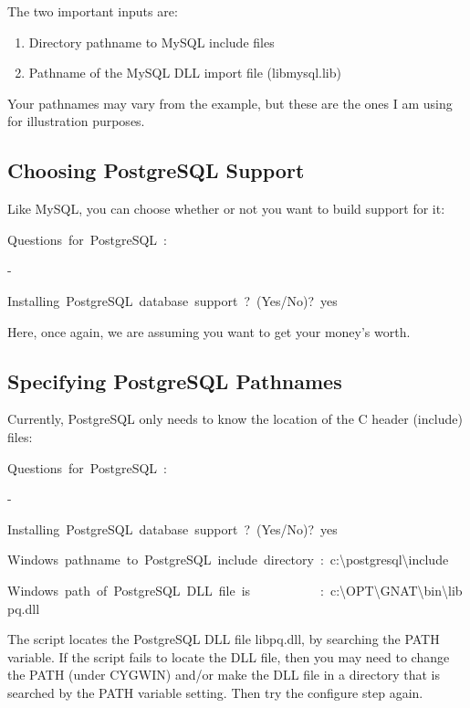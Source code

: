 \documentclass[english]{report}
\newenvironment{lyxcode}
   {\begin{list}{}{
     \setlength{\rightmargin}{\leftmargin}
     \setlength{\listparindent}{0pt}%
     \raggedright
     \setlength{\itemsep}{0pt}
     \setlength{\parsep}{0pt}
     \normalfont\ttfamily}%
    \item[]}
   {\end{list}}
\begin{document}
The two important inputs are:

\begin{enumerate}
\item Directory pathname to MySQL include files 
\item Pathname of the MySQL DLL import file (libmysql.lib)
\end{enumerate}
Your pathnames may vary from the example, but these are the ones I
am using for illustration purposes.


\subsection{Choosing PostgreSQL Support}

Like MySQL, you can choose whether or not you want to build support
for it:

\begin{lyxcode}
Questions~for~PostgreSQL~:

-

Installing~PostgreSQL~database~support~?~(Yes/No)?~yes
\end{lyxcode}
Here, once again, we are assuming you want to get your money's worth.


\subsection{Specifying PostgreSQL Pathnames}

Currently, PostgreSQL only needs to know the location of the C header
(include) files:

\begin{lyxcode}
{\footnotesize Questions~for~PostgreSQL~:}{\footnotesize \par}

-

{\footnotesize Installing~PostgreSQL~database~support~?~(Yes/No)?~yes}{\footnotesize \par}

{\footnotesize Windows~pathname~to~PostgreSQL~include~directory~:~c:\textbackslash{}postgresql\textbackslash{}include}{\footnotesize \par}

{\footnotesize Windows~path~of~PostgreSQL~DLL~file~is~~~~~~~~~~~:~c:\textbackslash{}OPT\textbackslash{}GNAT\textbackslash{}bin\textbackslash{}libpq.dll}{\footnotesize \par}
\end{lyxcode}
The script locates the PostgreSQL DLL file libpq.dll, by searching
the PATH variable. If the script fails to locate the DLL file, then
you may need to change the PATH (under CYGWIN) and/or make the DLL
file in a directory that is searched by the PATH variable setting.
Then try the configure step again.
\end{document}
